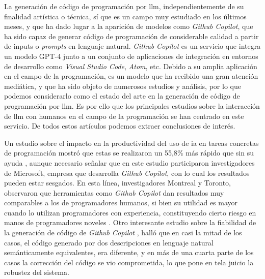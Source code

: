 La generación de código de programación por \gls{llm}, independientemente de su finalidad artística o técnica, sí que es un campo muy estudiado en los últimos meses, y que ha dado lugar a la aparición de modelos como \textit{Github Copilot}, que ha sido capaz de generar código de programación de considerable calidad a partir de inputs o \textit{prompts} en lenguaje natural. \textit{Github Copilot} es un servicio que integra un modelo GPT-4 junto a un conjunto de aplicaciones de integración en entornos de desarrollo como \textit{Visual Studio Code}, \textit{Atom}, etc. Debido a su amplia aplicación en el campo de la programación, es un modelo que ha recibido una gran atención mediática, y que ha sido objeto de numerosos estudios y análisis, por lo que podemos considerarlo como el estado del arte en la generación de código de programación por \gls{llm}. Es por ello que los principales estudios sobre la interacción de \gls{llm} con humanos en el campo de la programación se han centrado en este servicio. De todos estos artículos podemos extraer conclusiones de interés.

Un estudio sobre el impacto en la productividad del uso de \gls{ia} en tareas concretas de programación mostró que estas se realizaron un 55,8\% más rápido que sin su ayuda \citep{pengImpactAIDeveloper2023a}, aunque necesario señalar que en este estudio participaron investigadores de Microsoft, empresa que desarrolla \textit{Github Copilot}, con lo cual los resultados pueden estar sesgados. En esta línea, investigadores Montreal y Toronto, observaron que herramientas como \textit{Github Copilot} dan resultados muy comparables a los de programadores humanos, si bien su utilidad es mayor cuando lo utilizan programadores con experiencia, constituyendo cierto riesgo en manos de programadores noveles \citep{moradidakhelGitHubCopilotAI2023}. Otro interesante estudio sobre la fiabilidad de la generación de código de \textit{Github Copilot} \citep{mastropaoloRobustnessCodeGeneration2023}, halló que en casi la mitad de los casos, el código generado por dos descripciones en lenguaje natural semánticamente equivalentes, era diferente, y en más de una cuarta parte de los casos la corrección del código se vio comprometida, lo que pone en tela juicio la robustez del sistema.


